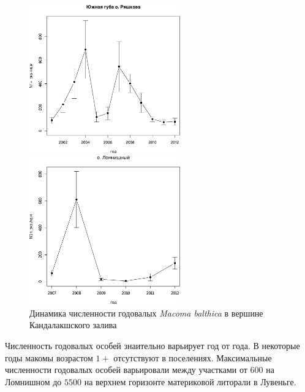 \begin{figure}[p]
	\begin{minipage}[b]{.46\linewidth}
	\begin{center}
		\includegraphics[width=65mm]{../White_Sea/Ryashkov_YuG/YuG_N_oneyear1.pdf}
	\end{center}
	\end{minipage}
%
	\hfil %
%
	\begin{minipage}[b]{.46\linewidth}
	\begin{center}
		\includegraphics[width=65mm]{../White_Sea/Lomnishniy/Lomnishniy_N_oneyear1.pdf}
	\end{center}
	\end{minipage}

	\caption{Динамика численности годовалых {\it Macoma balthica} в вершине Кандалакшского залива}
	\label{ris:dynamic_1year_Kandalaksha}
	\end{figure}
Численность годовалых особей знаительно варьирует год от года. 
В некоторые годы макомы возрастом $1+$ отсутствуют в поселениях.
Максимальные численности годовалых особей варьировали между участками от $600$ на Ломнишном до $5500$ на верхнем горизонте материковой литорали в Лувеньге.

